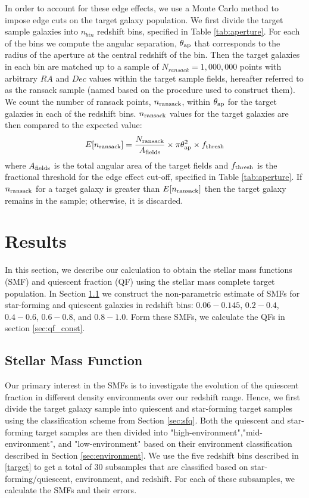 \documentclass{emulateapj}
\begin{document}
In order to account for these edge effects, we use a Monte Carlo method to impose edge cuts on the target galaxy population. 
We first divide the target sample galaxies into $n_{bin}$ redshift bins, specified in Table \ref{tab:aperture}. 
For each of the bins we compute the angular separation, $\theta_{\rm{ap}}$ that corresponds to the radius of the aperture at the central redshift of the bin.
Then the target galaxies in each bin are matched up to a sample of $N_{ransack}=1,000,000$ points with arbitrary $RA$ and $Dec$ values within the target sample fields, 
hereafter referred to as the ransack sample (named based on the procedure used to construct them). 
We count the number of ransack points, $n_{\rm{ransack}}$, within $\theta_{\rm{ap}}$ for the target galaxies in each of the redshift bins.
$n_{\rm{ransack}}$ values for the target galaxies are then compared to the expected value:
\begin{equation} \label{eq:ransack}
E[n_{\rm{ransack}}] = \frac{N_{\rm{ransack}}}{A_{\rm{fields}}}\times {\pi \theta_{\rm{ap}}^2} \times f_{\rm{thresh}} 
\end{equation} 
where $A_{\rm{fields}}$ is the total angular area of the target fields and $f_{\rm{thresh}}$ is the fractional threshold for the edge effect cut-off, specified in Table 
\ref{tab:aperture}.
If $n_{\rm{ransack}}$ for a target galaxy is greater than $E[n_{\rm{ransack}}]$ then the target galaxy remains in the sample; otherwise, it is discarded. 

\section{Results}
In this section, we describe our calculation to obtain the stellar mass functions (SMF) and quiescent fraction (QF) using the stellar mass complete target population.
In Section \ref{sec:smf_const} we construct the non-parametric estimate of SMFs for star-forming and quiescent galaxies in redshift bins: $0.06-0.145$, $0.2-0.4$, 
$0.4-0.6$, $0.6-0.8$, and $0.8-1.0$.
Form these SMFs, we calculate the QFs in section \ref{sec:qf_const}.

\subsection{Stellar Mass Function} \label{sec:smf_const}
Our primary interest in the SMFs is to investigate the evolution of the quiescent fraction in different density environments over our redshift range. 
Hence, we first divide the target galaxy sample into quiescent and star-forming target samples using the classification scheme from Section \ref{sec:sfq}.
Both the quiescent and star-forming target samples are then divided into "high-environment","mid-environment", and "low-environment" based on their environment classification described in 
Section \ref{sec:environment}.
We use the five redshift bins described in \ref{target} to get a total of $30$ subsamples that are classified based on star-forming/quiescent, environment, and redshift.
For each of these subsamples, we calculate the SMFs and their errors. 
\end{document}
